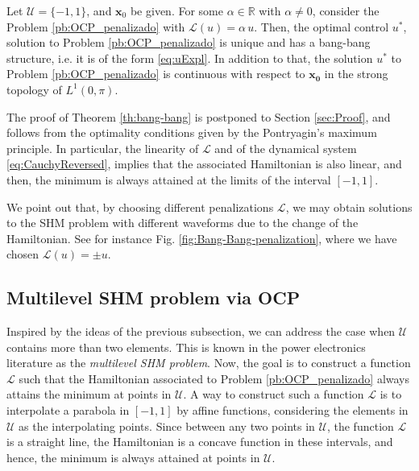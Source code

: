 \documentclass[9pt,shortpaper,twoside,web]{ieeecolor}
\begin{document}
\begin{theorem}\label{th:bang-bang}
	Let $\mathcal{U}=\{ -1, 1\}$, and $\bm{x}_0$ be given.  For some $\alpha\in \mathbb{R}$ with $\alpha\neq 0$, consider the Problem \ref{pb:OCP_penalizado} with $\mathcal{L} (u) = \alpha\, u$. Then, the optimal control $u^\ast$, solution to Problem \ref{pb:OCP_penalizado} is unique and has a bang-bang structure, i.e. it is of the form \eqref{eq:uExpl}. In addition to that, the solution $u^\ast$ to Problem \ref{pb:OCP_penalizado} is continuous  with respect to $\bm{x_0}$ in the strong topology of $L^1(0,\pi)$.
\end{theorem}

The proof of Theorem \ref{th:bang-bang} is postponed to Section \ref{sec:Proof}, and follows from the optimality conditions given by the Pontryagin's maximum principle. In particular, the linearity of $\mathcal{L}$ and of  the dynamical system \eqref{eq:CauchyReversed}, implies that the associated Hamiltonian is also  linear, and then, the minimum is always attained at the limits of the interval $[-1,1]$.

We point out that, by choosing different penalizations $\mathcal{L}$, we may obtain solutions to the SHM problem with different waveforms due to the change of the Hamiltonian. See for instance Fig. \ref{fig:Bang-Bang-penalization}, where we have chosen $\mathcal{L}(u) = \pm u$.

\subsection{Multilevel SHM problem via OCP}

Inspired by the ideas of the previous subsection, we can address the case when $\mathcal{U}$ contains more than two elements. This is known in the power electronics literature as the \textit{multilevel SHM problem}. Now, the goal is to construct a function $\mathcal{L}$ such that the Hamiltonian associated to Problem \ref{pb:OCP_penalizado} always attains the minimum at points in $\mathcal{U}$. A way to construct such a function $\mathcal{L}$ is to interpolate a parabola in $[-1,1]$ by affine functions, considering the elements in $\mathcal{U}$ as the interpolating points.  Since between any two points in $\mathcal{U}$,  the function $\mathcal{L}$ is a straight line,  the Hamiltonian is a concave function in these intervals, and hence, the minimum is always attained at points in $\mathcal{U}$.
\end{document}

